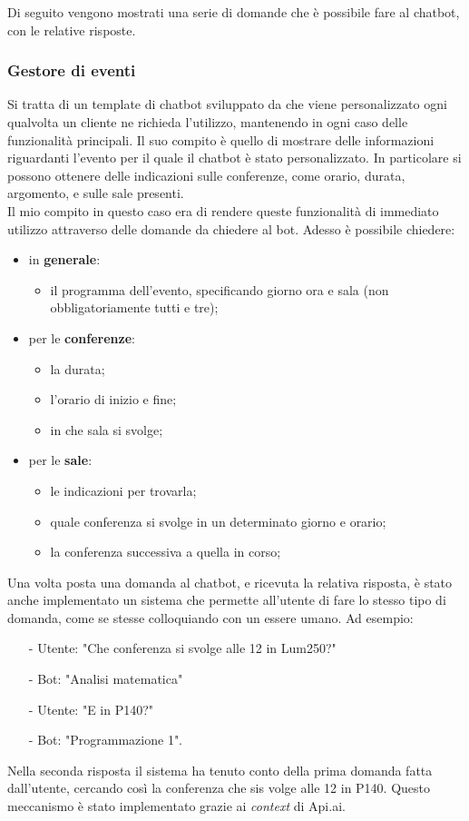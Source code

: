 Di seguito vengono mostrati una serie di domande che è possibile fare al \gls{chatbot}, con le relative risposte.

\subsubsection{Gestore di eventi}
Si tratta di un template di \gls{chatbot} sviluppato da \azienda{} che viene  personalizzato ogni qualvolta un cliente ne richieda l'utilizzo, mantenendo in ogni caso delle funzionalità principali. Il suo compito è quello di mostrare delle informazioni riguardanti l'evento per il quale il \gls{chatbot} è stato personalizzato. In particolare si possono ottenere delle indicazioni sulle conferenze, come orario, durata, argomento, e sulle sale presenti.\\
Il mio compito in questo caso era di rendere queste funzionalità di immediato utilizzo attraverso delle domande da chiedere al bot. Adesso è possibile chiedere:
\begin{itemize}
	\item in \textbf{generale}:
	\begin{itemize}
		\item il programma dell'evento, specificando giorno ora e sala (non obbligatoriamente tutti e tre);
	\end{itemize}
	\item per le \textbf{conferenze}:
	\begin{itemize}
		\item la durata;
		\item l'orario di inizio e fine;
		\item in che sala si svolge;
	\end{itemize}
	\item per le \textbf{sale}:
	\begin{itemize}
		\item le indicazioni per trovarla;
		\item quale conferenza si svolge in un determinato giorno e orario;
		\item la conferenza successiva a quella in corso;
	\end{itemize}
\end{itemize}

Una volta posta una domanda al \gls{chatbot}, e ricevuta la relativa risposta, è stato anche implementato un sistema che permette all'utente di fare lo stesso tipo di domanda, come se stesse colloquiando con un essere umano. Ad esempio:

\begin{itemize}
	\item[-] Utente: "Che conferenza si svolge alle 12 in Lum250?"
	\item[-] Bot: "Analisi matematica"
	\item[-] Utente: "E in P140?"
	\item[-] Bot: "Programmazione 1".
\end{itemize}
Nella seconda risposta il sistema ha tenuto conto della prima domanda fatta dall'utente, cercando così la conferenza che sis volge alle 12 in P140. Questo meccanismo è stato implementato grazie ai \emph{context} di Api.ai.

